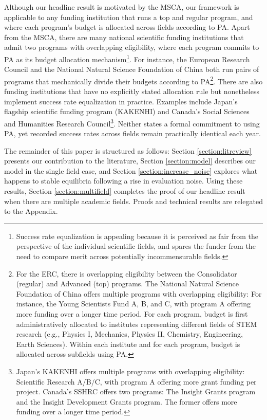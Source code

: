 \documentclass[12pt,reqno]{amsart}
\theoremstyle{definition}
\theoremstyle{plain} %
\begin{document}
\noindent Although our headline result is motivated by the MSCA, our framework is applicable to any funding institution that runs a top and regular program, and where each program's budget is allocated across fields according to PA. Apart from the MSCA, there are many national scientific funding institutions that admit two programs with overlapping eligibility, where each program commits to PA as its budget allocation mechanism\footnote{Success rate equalization is appealing because it is perceived as fair from the perspective of the individual scientific fields, and spares the funder from the need to compare merit across potentially incommensurable fields.}. For instance, the European Research Council and the National Natural Science Foundation of China both run pairs of programs that mechanically divide their budgets according to PA\footnote{For the ERC, there is overlapping eligibility between the Consolidator (regular) and Advanced (top) programs. The National Natural Science Foundation of China offers multiple programs with overlapping eligibility: For instance, the Young Scientists Fund A, B, and C, with program A offering more funding over a longer time period. For each program, budget is first administratively allocated to institutes representing different fields of STEM research (e.g., Physics I, Mechanics, Physics II, Chemistry, Engineering, Earth Sciences).  Within each institute and for each program, budget is allocated across subfields using PA.}. There are also funding institutions that have no explicitly stated allocation rule but nonetheless implement success rate equalization in practice. Examples include Japan's flagship scientific funding program (KAKENHI) and Canada's Social Sciences and Humanities Research Council\footnote{Japan's KAKENHI offers multiple programs with overlapping eligibility: Scientific Research A/B/C, with program A offering more grant funding per project. Canada's SSHRC offers two programs: The Insight Grants program and the Insight Development Grants program. The former offers more funding over a longer time period.}. Neither states a formal commitment to using PA, yet recorded success rates across fields remain practically identical each year. 

\noindent The remainder of this paper is structured as follows: Section \ref{section:litreview} presents our contribution to the literature, Section \ref{section:model} describes our model in the single field case, and Section \ref{section:increase_noise} explores what happens to stable equilibria following a rise in evaluation noise. Using these results, Section \ref{section:multifield} completes the proof of our headline result when there are multiple academic fields. Proofs and technical results are relegated to the Appendix. 
\end{document}
